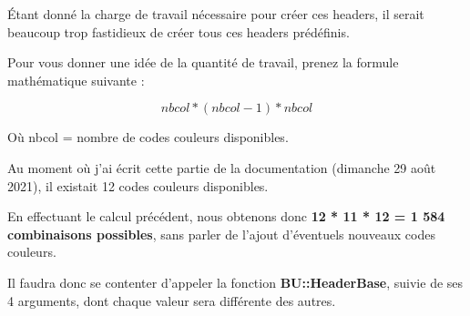 \documentclass[a4paper,10pt]{article}
\begin{document}
\begin{justify}
    Étant donné la charge de travail nécessaire pour créer ces headers, il serait beaucoup trop fastidieux de créer tous ces headers prédéfinis.
\end{justify}

\begin{justify}
    Pour vous donner une idée de la quantité de travail, prenez la formule mathématique suivante :
\end{justify}

\[nbcol * (nbcol - 1) * nbcol\]

\begin{justify}
    Où nbcol = nombre de codes couleurs disponibles.
\end{justify}

\begin{justify}
    Au moment où j'ai écrit cette partie de la documentation (dimanche 29 août 2021), il existait 12 codes couleurs disponibles.
\end{justify}

\begin{justify}
    En effectuant le calcul précédent, nous obtenons donc \textbf{12 * 11 * 12 = 1 584 combinaisons possibles}, sans parler de l'ajout d'éventuels nouveaux codes couleurs.
\end{justify}

\begin{justify}
    Il faudra donc se contenter d'appeler la fonction \textbf{\color{mauve}BU::HeaderBase}, suivie de ses 4 arguments, dont chaque valeur sera différente des autres.
\end{justify}
\end{document}
